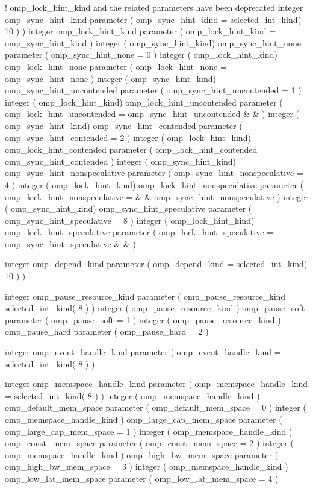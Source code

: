 {\begin{ompfSyntax}
! omp_lock_hint_kind and the related parameters have been deprecated
      integer omp_sync_hint_kind
      parameter ( omp_sync_hint_kind = selected_int_kind( 10 ) )
      integer omp_lock_hint_kind
      parameter ( omp_lock_hint_kind = omp_sync_hint_kind )
      integer ( omp_sync_hint_kind) omp_sync_hint_none
      parameter ( omp_sync_hint_none = 0 )
      integer ( omp_lock_hint_kind) omp_lock_hint_none
      parameter ( omp_lock_hint_none = omp_sync_hint_none )
      integer ( omp_sync_hint_kind) omp_sync_hint_uncontended
      parameter ( omp_sync_hint_uncontended = 1 )
      integer ( omp_lock_hint_kind) omp_lock_hint_uncontended
      parameter ( omp_lock_hint_uncontended = omp_sync_hint_uncontended &
     & )
      integer ( omp_sync_hint_kind) omp_sync_hint_contended
      parameter ( omp_sync_hint_contended = 2 )
      integer ( omp_lock_hint_kind) omp_lock_hint_contended
      parameter ( omp_lock_hint_contended = omp_sync_hint_contended )
      integer ( omp_sync_hint_kind) omp_sync_hint_nonspeculative
      parameter ( omp_sync_hint_nonspeculative = 4 )
      integer ( omp_lock_hint_kind) omp_lock_hint_nonspeculative
      parameter ( omp_lock_hint_nonspeculative =                        &
     & omp_sync_hint_nonspeculative )
      integer ( omp_sync_hint_kind) omp_sync_hint_speculative
      parameter ( omp_sync_hint_speculative = 8 )
      integer ( omp_lock_hint_kind) omp_lock_hint_speculative
      parameter ( omp_lock_hint_speculative = omp_sync_hint_speculative &
     & )

      integer omp_depend_kind
      parameter ( omp_depend_kind = selected_int_kind( 10 ) )

      integer omp_pause_resource_kind
      parameter ( omp_pause_resource_kind = selected_int_kind( 8 ) )
      integer ( omp_pause_resource_kind ) omp_pause_soft
      parameter ( omp_pause_soft = 1 )
      integer ( omp_pause_resource_kind ) omp_pause_hard
      parameter ( omp_pause_hard = 2 )

      integer omp_event_handle_kind
      parameter ( omp_event_handle_kind = selected_int_kind( 8 ) )

      integer omp_memspace_handle_kind
      parameter ( omp_memspace_handle_kind = selected_int_kind( 8 ) )
      integer ( omp_memspace_handle_kind ) omp_default_mem_space
      parameter ( omp_default_mem_space = 0 )
      integer ( omp_memspace_handle_kind ) omp_large_cap_mem_space
      parameter ( omp_large_cap_mem_space = 1 )
      integer ( omp_memspace_handle_kind ) omp_const_mem_space
      parameter ( omp_const_mem_space = 2 )
      integer ( omp_memspace_handle_kind ) omp_high_bw_mem_space
      parameter ( omp_high_bw_mem_space = 3 )
      integer ( omp_memspace_handle_kind ) omp_low_lat_mem_space
      parameter ( omp_low_lat_mem_space = 4 )


\end{ompfSyntax}}
